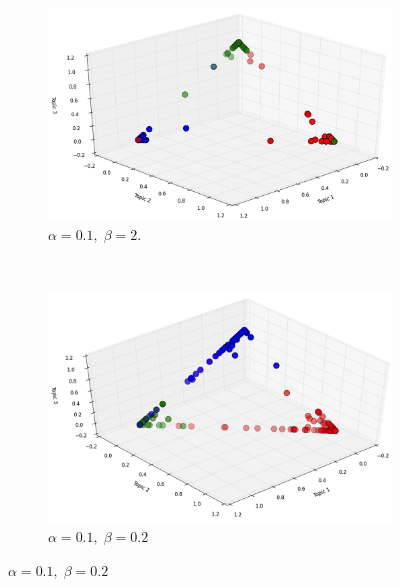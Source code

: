 \documentclass[twoside,12pt]{article}
\begin{document}
\begin{figure}
        \centering
        \begin{subfigure}[b]{0.5\textwidth}
                \includegraphics[width=\textwidth]{figs/classicalpha01beta2.png}
                \caption{$\alpha=0.1,\;\beta=2.$}
                \label{fig:gull}
        \end{subfigure}%
        ~ %
        \begin{subfigure}[b]{0.5\textwidth}
                \includegraphics[width=\textwidth]{figs/classicalpha01beta02.png}
                \caption{$\alpha=0.1,\;\beta=0.2$}
                \label{fig:tiger}
        \end{subfigure}
        

\end{figure}
\end{document}
